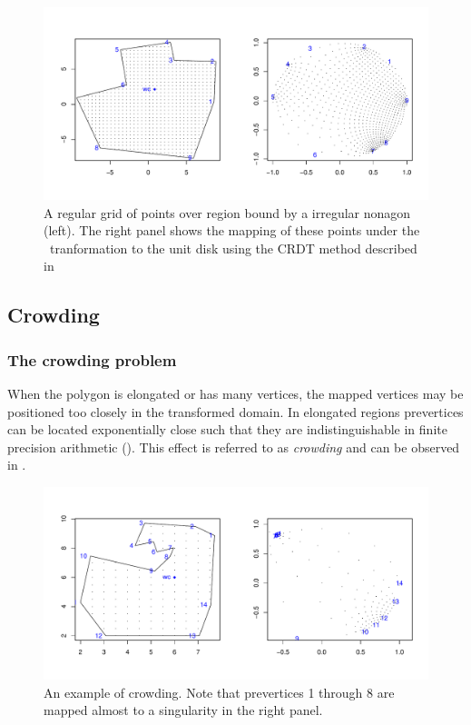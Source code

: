 \begin{figure}[t]
\centering
\includegraphics[scale=0.5]{sc/figs/irregulardomain.pdf}
\caption{A regular grid of points over region bound by a irregular nonagon (left). The right panel shows the mapping of these points under the \sch\ tranformation to the unit disk using the CRDT method described in }
\label{irregdomain}
\end{figure}

\subsection{Crowding}
\label{sch-crowding}

\subsubsection{The crowding problem}

When the polygon is elongated or has many vertices, the mapped vertices may be positioned too closely in the transformed domain. In elongated regions prevertices can be located exponentially close such that they are indistinguishable in finite precision arithmetic (\cite{howell90}). This effect is referred to as \emph{crowding} and can be observed in . 

\begin{figure} [tbp]
\centering
\includegraphics[scale=0.5]{sc/figs/crowdeddisk.pdf}
\caption{An example of crowding. Note that prevertices 1 through 8 are mapped almost to a singularity in the right panel.}
\label{crowdeddisk}
\end{figure}

